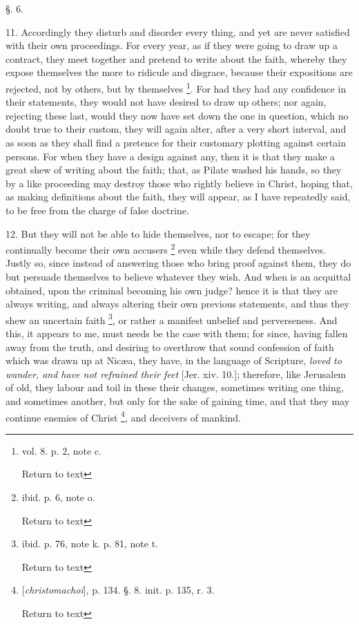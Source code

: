 §. 6.

11. Accordingly they disturb and disorder every
thing, and yet are never satisfied with their own proceedings. For
every year, as if they were going to draw up a contract, they
meet together and pretend to write about the faith, whereby they
expose themselves the more to ridicule and disgrace, because their
expositions are rejected, not by others, but by themselves \footnote{vol. 8. p. 2, note c.

Return to text}. For had they had any confidence in their statements, they
would not have desired to draw up others; nor again, rejecting these
last, would they now have set down the one in question, which no doubt
true to their custom, they will again alter, after a very short
interval, and as soon as they shall find a pretence for their
customary plotting against certain persons. For when they have a
design against any, then it is that they make a great shew of writing
about the faith; that, as Pilate washed his hands, so they by a like
proceeding may destroy those who rightly believe in Christ, hoping
that, as making definitions about the faith, they will appear, as I
have repeatedly said, to be free from the charge of false doctrine.

12. But they will not be able to hide themselves,
nor to escape; for they continually become their own accusers \footnote{ibid. p. 6, note o.

Return to text} even while they defend themselves. Justly so, since instead of
answering those who bring proof against them, they do but persuade
themselves to believe whatever they wish. And when is an acquittal
obtained, upon the criminal becoming his own judge? hence it is that
they are always writing, and always altering their own previous
statements, and thus they shew an uncertain faith \footnote{ibid. p. 76, note k. p. 81, note t.

Return to text}, or rather a manifest unbelief and perverseness. And this, it
appears to me, must needs be the case with them; for since, having
fallen away from the truth, and desiring to overthrow that sound
confession of faith which was drawn up at Nicæa, they have, in the
language of Scripture, \emph{loved to wander, and have not refrained
their feet} [Jer. xiv. 10.]; therefore, like Jerusalem of old, they
labour and toil in these their changes, sometimes writing one thing,
and sometimes another, but only for the sake of gaining time, and that
they may continue enemies of Christ \footnote{[\emph{christomachoi}], p. 134. §. 8. init. p. 135, r. 3.

Return to text}, and deceivers of mankind.

